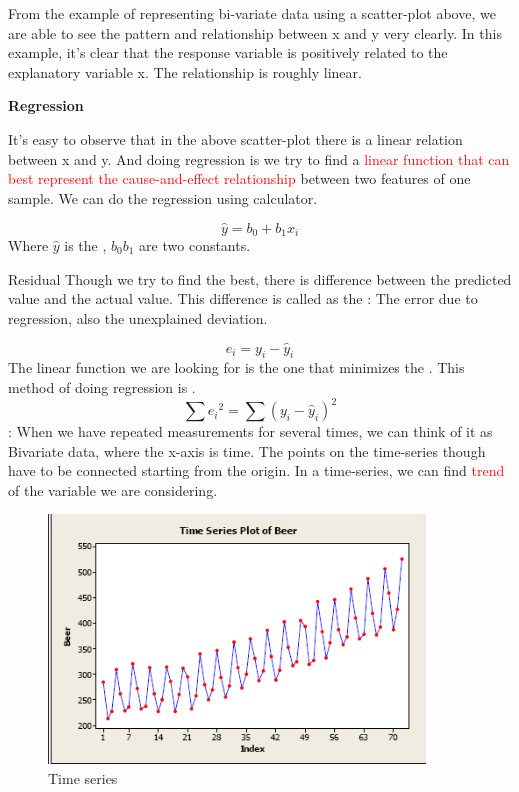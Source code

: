 From the example of representing bi-variate data using a scatter-plot above, we are able to see the pattern and relationship between x and y very clearly. In this example, it's clear that the response variable is positively related to the explanatory variable x. The relationship is roughly linear.
\vspace{6ex}
\begin{Center}
    \textbf{Regression}
\end{Center}
It's easy to observe that in the above scatter-plot there is a linear relation between x and y. And doing regression is we try to find a \textcolor{red}{linear function that can best represent the cause-and-effect relationship} between two features of one sample. We can do the regression using calculator.

\begin{equation}
    \hat{y}=b_0+b_1x_i
\end{equation}
Where \(\hat{y}\) is the , \(b_0 b_1\) are two constants.\\
\begin{paragraph}{Residual}
    Though we try to find the best, there is difference between the predicted value and the actual value. This difference is called as the : The error due to regression, also the unexplained deviation.
\end{paragraph}
\begin{equation}
    e_i=y_i-\hat{y}_i
\end{equation}
The linear function we are looking for is the one that minimizes the . This method of doing regression is .
\begin{equation}
    \sum{{e_i}^2}=\sum{(y_i-\hat{y}_i)^2}
\end{equation}
: When we have repeated measurements for several times, we can think of it as Bivariate data, where the x-axis is time. The points on the time-series though have to be connected starting from the origin. In a time-series, we can find \textcolor{red}{trend} of the variable we are considering.
\begin{figure}[H]
    \centering
        \includegraphics[width=100mm]{times.png}
        \caption{Time series}
        \label{fig:my_label}
\end{figure}

